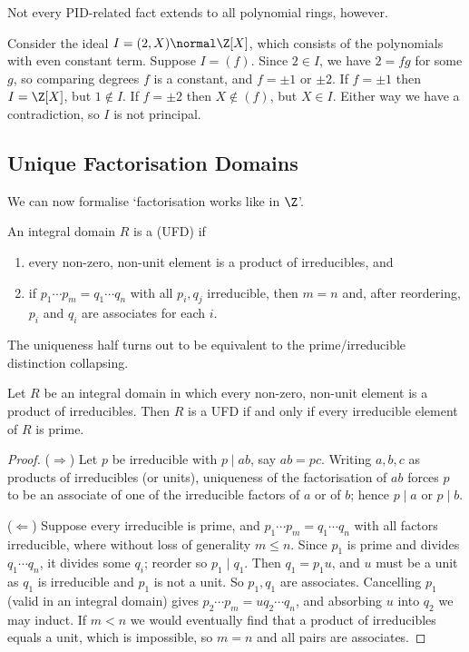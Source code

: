 Not every PID-related fact extends to all polynomial rings, however.

\begin{example}
	Consider the ideal $I = (2, X) \normal \Z[X]$, which consists of the polynomials with even constant term. Suppose $I = (f)$. Since $2 \in I$, we have $2 = fg$ for some $g$, so comparing degrees $f$ is a constant, and $f = \pm 1$ or $\pm 2$. If $f = \pm 1$ then $I = \Z[X]$, but $1 \notin I$. If $f = \pm 2$ then $X \notin (f)$, but $X \in I$. Either way we have a contradiction, so $I$ is not principal.
\end{example}

\subsection{Unique Factorisation Domains}

We can now formalise `factorisation works like in $\Z$'.

\begin{definition}
	An integral domain $R$ is a  (UFD) if
	\begin{enumerate}[label=(\roman*)]
		\item every non-zero, non-unit element is a product of irreducibles, and
		\item if $p_1 \cdots p_m = q_1 \cdots q_n$ with all $p_i, q_j$ irreducible, then $m = n$ and, after reordering, $p_i$ and $q_i$ are associates for each $i$.
	\end{enumerate}
\end{definition}

The uniqueness half turns out to be equivalent to the prime/irreducible distinction collapsing.

\begin{proposition}
	Let $R$ be an integral domain in which every non-zero, non-unit element is a product of irreducibles. Then $R$ is a UFD if and only if every irreducible element of $R$ is prime.
\end{proposition}
\begin{proof}
	($\Rightarrow$) Let $p$ be irreducible with $p \mid ab$, say $ab = pc$. Writing $a, b, c$ as products of irreducibles (or units), uniqueness of the factorisation of $ab$ forces $p$ to be an associate of one of the irreducible factors of $a$ or of $b$; hence $p \mid a$ or $p \mid b$.

	($\Leftarrow$) Suppose every irreducible is prime, and $p_1 \cdots p_m = q_1 \cdots q_n$ with all factors irreducible, where without loss of generality $m \leq n$. Since $p_1$ is prime and divides $q_1 \cdots q_n$, it divides some $q_i$; reorder so $p_1 \mid q_1$. Then $q_1 = p_1 u$, and $u$ must be a unit as $q_1$ is irreducible and $p_1$ is not a unit. So $p_1, q_1$ are associates. Cancelling $p_1$ (valid in an integral domain) gives $p_2 \cdots p_m = u q_2 \cdots q_n$, and absorbing $u$ into $q_2$ we may induct. If $m < n$ we would eventually find that a product of irreducibles equals a unit, which is impossible, so $m = n$ and all pairs are associates.
\end{proof}


